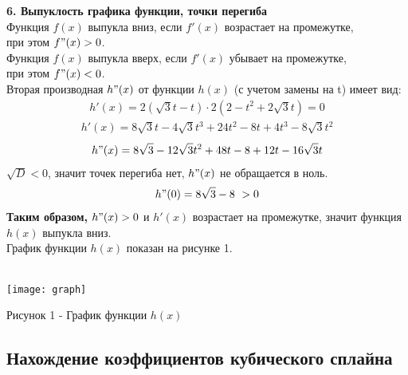 \documentclass[russian,utf8,nocolumnxxxi,nocolumnxxxii]{eskdtext}
\begin{document}
{      \textbf{6. Выпуклость графика функции, точки перегиба}\\
     Функция ${f(x)}$ выпукла вниз, если ${f'(x)}$ возрастает на промежутке, \\
     при этом  ${f"(x)}>0$.\\
      Функция ${f(x)}$ выпукла вверх, если ${f'(x)}$ убывает на промежутке, \\
      при этом  ${f"(x)}<0$.\\[10pt]
     Вторая производная ${h"(x)}$ от функции ${h(x)}$ (с учетом замены на {t}) имеет вид:\\
     \begin{equation}\label{eq:num24}
     \begin{align}
     h'(x)=2(\sqrt{3}t-t)\cdot2(2-t^2+2\sqrt{3}t)=0
     \end{align}
     \end{equation}
      \begin{equation}\label{eq:num25}
      \begin{align}
      h'(x)=8\sqrt{3}t-4\sqrt{3}t^3+24t^2-8t+4t^3-8\sqrt{3}t^2
      \end{align}
      \end{equation}
       \begin{equation}\label{eq:num26}
       \begin{align}
       h"(x)=8\sqrt{3}-12\sqrt{3}t^2+48t-8+12t-16\sqrt{3}t
       \end{align}
       \end{equation}
       $\sqrt{D}<0$, значит точек перегиба нет, $h"(x)$ не обращается в ноль.
       \begin{equation}\label{eq:num27}
       \begin{align}
       h"(0)=8\sqrt{3}-8\,\,>0
       \end{align}
       \end{equation}
       \textbf{Таким образом,} $h"(x)>0$ и ${h'(x)}$ возрастает на промежутке, значит
       функция ${h(x)}$ выпукла вниз.\\
       График функции ${h(x)}$ показан на рисунке 1. \\\\
       \begin{center}
       	\texttt{[image: graph]}
       \end{center}
       \begin{center}
       	Рисунок 1 - График функции ${h(x)}$
       \end{center}
      \newpage
      \subsection{Нахождение коэффициентов кубического сплайна}
     \upshape
}
\end{document}
